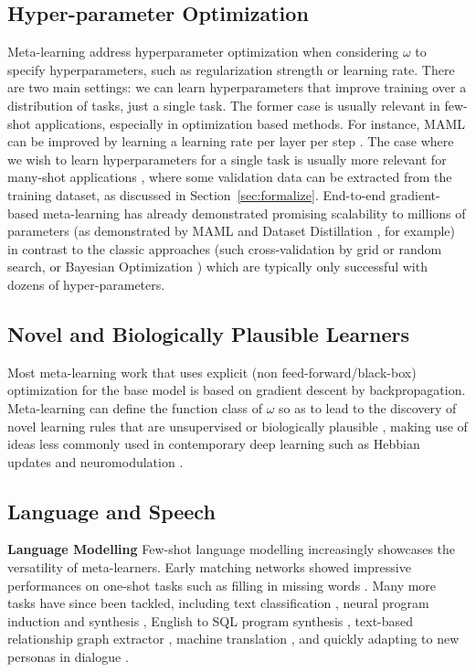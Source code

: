 \documentclass[10pt,journal,compsoc]{IEEEtran}
\newcommand{\keypoint}[1]{\vspace{0.1cm}\noindent\textbf{#1}\quad}
\begin{document}
\subsection{Hyper-parameter Optimization} Meta-learning address hyperparameter optimization when considering $\omega$ to specify hyperparameters, such as regularization strength or learning rate. There are two main settings: we can learn hyperparameters that improve training over a distribution of tasks, just a single task. The former case is usually relevant in few-shot applications, especially in optimization based methods. For instance, MAML can be improved by learning a learning rate per layer per step \cite{antoniou2018maml}. The case where we wish to learn hyperparameters for a single task is usually more relevant for many-shot applications \cite{lorraine2019optmillionsofhyperparams,micaelli2020nongreedy}, where some validation data can be extracted from the training dataset, as discussed in Section~\ref{sec:formalize}. End-to-end gradient-based meta-learning has already demonstrated promising scalability to millions of parameters (as demonstrated by MAML \cite{finn2017maml} and Dataset Distillation \cite{wang2018datasetdistill, lorraine2019optmillionsofhyperparams}, for example) in contrast to the classic approaches
(such cross-validation by grid or random \cite{bergstra2012randomsearchhyper} search, or Bayesian Optimization \cite{shahriari2016bayesianoptimizationsurvey}) which are typically only successful with dozens of hyper-parameters.




\subsection{Novel and Biologically Plausible Learners}
Most meta-learning work that uses explicit (non feed-forward/black-box) optimization for the base model is based on gradient descent by backpropagation. Meta-learning can define the function class of $\omega$ so as to lead to the discovery of novel learning rules that are unsupervised \cite{metz2018meta} or biologically plausible \cite{bengio1990learning,miconi2018differentiable,miconi2019backpropamine}, making use of ideas less commonly used in contemporary deep learning such as Hebbian updates \cite{miconi2018differentiable} and neuromodulation \cite{miconi2019backpropamine}.


\subsection{Language and Speech}
\keypoint{Language Modelling} Few-shot language modelling increasingly showcases the versatility of meta-learners. Early matching networks showed impressive performances on one-shot tasks such as filling in missing words \cite{vinyals2016matching}. Many more tasks have since been tackled, including text classification \cite{bao2019few}, neural program induction \cite{delvin2017neuralprogram} and synthesis \cite{si2018learning}, English to SQL program synthesis \cite{huang2018naturallanguagequery}, text-based relationship graph extractor \cite{nips2019_9182}, machine translation \cite{gu2018fewshottranslation}, and quickly adapting to new personas in dialogue  \cite{lin2019adaptingnewperson}.
\end{document}
